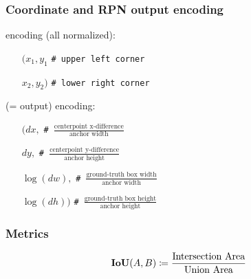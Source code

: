 \begin{frame}[t]
  \frametitle{Coordinate and RPN \reg{} output encoding}
  \begin{description}[<only@+>]
  \item[Box coordinate] encoding (all normalized):
    \begin{itemize}[<.->]
    \item[$(x_1,y_1$] \texttt{\# \small upper left corner}
    \item[$x_2,y_2)$] \texttt{\# \small lower right corner}
    \end{itemize}
    
  \item[Coordinate correction] (=\reg{} output) encoding:
    \begin{itemize}[<.->]
    \item[$\Big(dx,$]
      \texttt{\# \small $\frac
        {\text{centerpoint x-difference}}
        {\text{anchor width}}$}
      $\phantom{\Big|}$
    \item[$dy,$]
      \texttt{\# \small $\frac
        {\text{centerpoint y-difference}}
        {\text{anchor height}}$}
      $\phantom{\Big|}$
    \item[$\log(dw),$]
      \texttt{\# \small $\frac
        {\text{ground-truth box width}}
        {\text{anchor width}}$}
      $\phantom{\Big|}$
    \item[$\log(dh)\Big)$]
      \texttt{\# \small $\frac
        {\text{ground-truth box height}}
        {\text{anchor height}}$}
    \end{itemize}
  \end{description}
\end{frame}

\begin{frame}
  \frametitle<presentation>{Metrics}
  \begin{gather*}
    \text{\textbf{IoU}}(A, B) \coloneqq \dfrac{\text{Intersection Area}}{\text{Union Area}}
  \end{gather*}
\end{frame}

